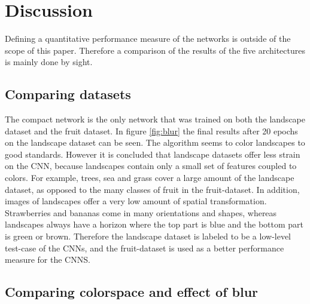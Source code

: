 \section{Discussion}

Defining a quantitative performance measure of the networks is outside of the scope of this paper. Therefore a comparison of the results of the five architectures is mainly done by sight.

\subsection{Comparing datasets}
The compact network is the only network that was trained on both the landscape dataset and the fruit dataset. In figure \ref{fig:blur} the final results after 20 epochs on the landscape dataset can be seen. The algorithm seems to color landscapes to good standards. However it is concluded that landscape datasets offer less strain on the CNN, because landscapes contain only a small set of features coupled to colors. For example, trees, sea and grass cover a large amount of the landscape dataset, as opposed to the many classes of fruit in the fruit-dataset. In addition, images of landscapes offer a very low amount of spatial transformation. Strawberries and bananas come in many orientations and shapes, whereas landscapes always have a horizon where the top part is blue and the bottom part is green or brown. Therefore the landscape dataset is labeled to be a low-level test-case of the CNNs, and the fruit-dataset is used as a better performance measure for the CNNS.

\subsection{Comparing colorspace and effect of blur}


